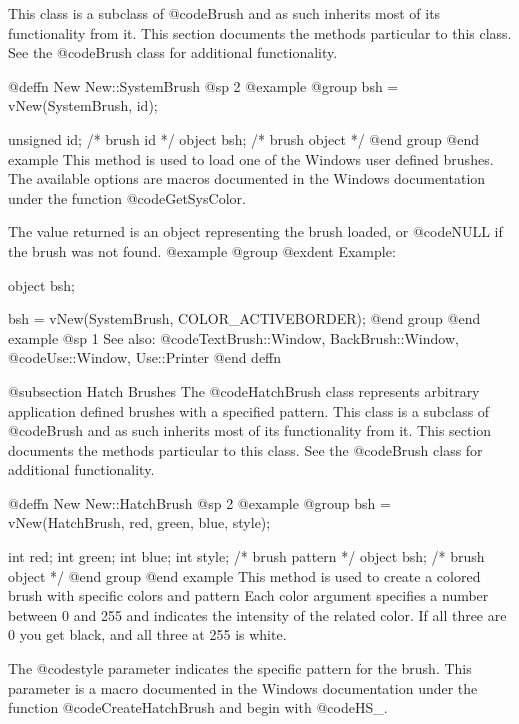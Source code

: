 This class is a subclass of @code{Brush} and as such inherits
most of its functionality from it.  This section documents the methods
particular to this class.  See the @code{Brush} class for additional
functionality.








@deffn {New} New::SystemBrush
@sp 2
@example
@group
bsh = vNew(SystemBrush, id);

unsigned id;    /*  brush id      */
object  bsh;    /*  brush object  */
@end group
@end example
This method is used to load one of the Windows user defined brushes.
The available options are macros documented in the Windows documentation
under the function @code{GetSysColor}.

The value returned is an object representing the brush loaded, or
@code{NULL} if the brush was not found.
@example
@group
@exdent Example:

object  bsh;

bsh = vNew(SystemBrush, COLOR_ACTIVEBORDER);
@end group
@end example
@sp 1
See also:  @code{TextBrush::Window, BackBrush::Window,}
        @code{Use::Window, Use::Printer}
@end deffn










@subsection Hatch Brushes
The @code{HatchBrush} class represents arbitrary application defined
brushes with a specified pattern.  This class is a subclass of
@code{Brush} and as such inherits most of its functionality from it.
This section documents the methods particular to this class.  See the
@code{Brush} class for additional functionality.






@deffn {New} New::HatchBrush
@sp 2
@example
@group
bsh = vNew(HatchBrush, red, green, blue, style);

int     red;
int     green;
int     blue;
int     style;  /*  brush pattern  */
object  bsh;    /*  brush object   */
@end group
@end example
This method is used to create a colored brush with specific colors and
pattern Each color argument specifies a number between 0 and 255 and
indicates the intensity of the related color.  If all three are 0 you
get black, and all three at 255 is white.

The @code{style} parameter indicates the specific pattern for the brush.
This parameter is a macro documented in the Windows documentation under
the function @code{CreateHatchBrush} and begin with @code{HS_}.

